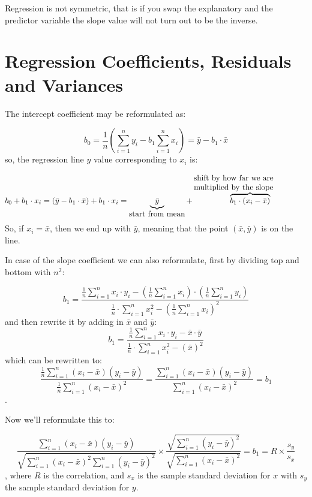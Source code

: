 Regression is not symmetric, that is if you swap the explanatory and the
predictor variable the slope value will not turn out to be the inverse.

\section{Regression Coefficients, Residuals and Variances}

The intercept coefficient may be reformulated as:

\[b_0 = \frac{1}{n} \left( \sum_{i=1}^{n} y _i - b_1 \sum_{i=1}^{n} x_i \right)
	= \bar{y} - b_1 \cdot \bar{x} \] so, the regression line $y$ value
corresponding to $x_i$ is:

\[ b_0+b_1\cdot x_i = (\bar{y} - b_1 \cdot \bar{x}) + b_1 \cdot x_i =
	\underbrace{\bar{y}}_{\mbox{start from mean}} + \overbrace{b_1 \cdot (x_i -
		\bar{x})}^{\parbox[t]{5cm}{shift by how far we are \\ multiplied by the slope}}
\]
So, if $x_i=\bar{x}$, then we end up with $\bar{y}$, meaning that the point
$(\bar{x}, \bar{y})$ is on the line.

In case of the slope coefficient we can also reformulate, first by dividing top
and bottom with $n^2$:

\[ b_1 = \frac{\frac{1}{n} \sum_{i=1}^{n} x_i \cdot y_i -
		\left( \frac{1}{n} \sum_{i=1}^{n} x_i \right) \cdot \left(
		\frac{1}{n} \sum_{i=1}^{n} y_i \right)}{\frac{1}{n} \cdot \sum_{i=1}^{n} x_i^2 -
		\left(\frac{1}{n} \sum_{i=1}^{n} x_i \right)^2} \] and then rewrite it by adding
in $\bar{x}$ and $\bar{y}$:
\[ b_1 = \frac{\frac{1}{n} \sum_{i=1}^{n} x_i \cdot y_i -
		\bar{x} \cdot \bar{y}}{\frac{1}{n} \cdot \sum_{i=1}^{n} x_i^2 -
		\left(\bar{x} \right)^2}\] which can be rewritten to:
\[ \frac{\frac{1}{n} \sum_{i=1}^{n} (x_i - \bar{x})(y_i - \bar{y})
	}{\frac{1}{n}\sum_{i=1}^{n}\left( x_i - \bar{x} \right)^2} = \frac{
		\sum_{i=1}^{n} (x_i - \bar{x})(y_i - \bar{y}) }{\sum_{i=1}^{n}\left(
		x_i - \bar{x} \right)^2} = b_1 \].

Now we'll reformulate this to:

\[ \frac{\sum_{i=1}^{n}(x_i - \bar{x})(y_i - \bar{y})}{\sqrt{\sum_{i=1}^{n}(x_i
			- \bar{x})^2 \sum_{i=1}^{n}(y_i -
			\bar{y})^2}} \times \frac{\sqrt{\sum_{i=1}^{n}(y_i - \bar{y})^2}}
	{\sqrt{\sum_{i=1}^{n}(x_i - \bar{x})^2}} = b_1 = R \times \frac{s_y}{s_x}\],
where $R$ is the correlation, and $s_x$ is the sample standard deviation for $x$
with $s_y$ the sample standard deviation for $y$.

